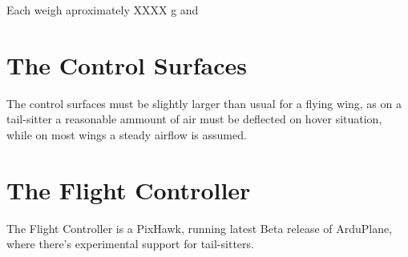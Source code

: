 Each weigh aproximately XXXX g and 

\section{The Control Surfaces}

The control surfaces must be slightly larger than usual for a flying wing, as on a tail-sitter a reasonable ammount of air must be deflected on hover situation, while on most wings a steady airflow is assumed.

\section{The Flight Controller}

The Flight Controller is a PixHawk, running latest Beta release of ArduPlane, where there's experimental support for tail-sitters.


